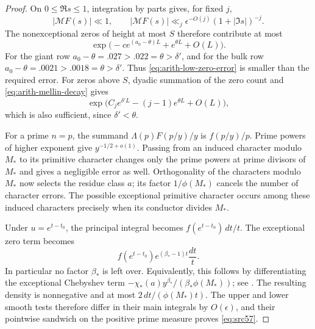 \begin{proof}
On $0\leq\Re s\leq1$, integration by parts gives, for fixed $j$,
\begin{equation}\label{eq:arith-mellin-decay}
 |\mathcal M F(s)|\ll1,\qquad
 |\mathcal M F(s)|\ll_j
       \epsilon^{-O(j)}(1+|\Im s|)^{-j}.
\end{equation}
The nonexceptional zeros of height at most $S$ therefore contribute at most
\begin{equation}\label{eq:arith-low-zero-error}
 \exp\bigl(-c e^{(a_0-\theta)L}+e^{\theta L}+O(L)\bigr).
\end{equation}
For the giant row $a_0-\theta=.027>.022=\theta>\delta'$, and for the bulk
row $a_0-\theta=.0021>.0018=\theta>\delta'$. Thus
\eqref{eq:arith-low-zero-error} is smaller than the required error. For
zeros above $S$, dyadic summation of the zero count and
\eqref{eq:arith-mellin-decay} gives
\[
 \exp\bigl(C_j e^{\delta'L}-(j-1)e^{\theta L}+O(L)\bigr),
\]
which is also sufficient, since $\delta'<\theta$.

For a prime $n=p$, the summand $\Lambda(p)F(p/y)/y$ is $f(p/y)/p$.
Prime powers of higher exponent give $y^{-1/2+o(1)}$. Passing from an
induced character modulo $M_*$ to its primitive character changes only the
prime powers at prime divisors of $M_*$ and gives a negligible error as
well. Orthogonality of the characters modulo $M_*$ now selects the residue
class $a$; its factor $1/\phi(M_*)$ cancels the number of character errors.
The possible exceptional primitive character occurs among these induced
characters precisely when its conductor divides $M_*$.

Under $u=e^{t-t_0}$, the principal integral becomes $f(e^{t-t_0})\,dt/t$.
The exceptional zero term becomes
\[
              f(e^{t-t_0})e^{(\beta_*-1)t}\frac{dt}{t}.
\]
In particular no factor $\beta_*$ is left over. Equivalently, this follows
by differentiating the exceptional Chebyshev term
$-\chi_*(a)y^{\beta_*}/(\beta_*\phi(M_*))$; see
\cite[Corollaries~11.17 and~11.20]{MontgomeryVaughan2007}.
The resulting density is nonnegative and at most $2\,dt/(\phi(M_*)t)$.
The upper and lower smooth tests therefore differ in their main integrals
by $O(\epsilon)$, and their pointwise sandwich on the positive prime measure
proves \eqref{eq:src57}.
\end{proof}

